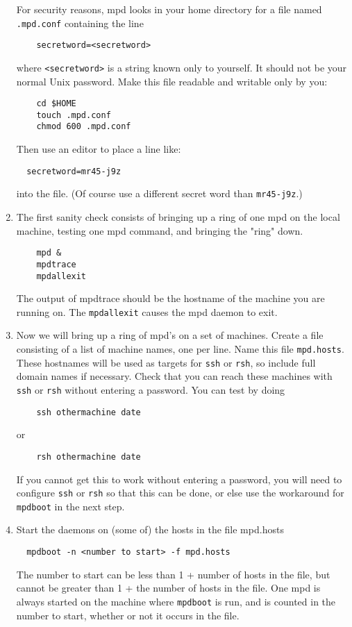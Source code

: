 \documentclass[dvipdfm,11pt]{article}
\begin{document}
\begin{enumerate}
For security reasons, mpd looks in your home directory for a file named
\texttt{.mpd.conf} containing the line
\begin{verbatim}
    secretword=<secretword>
\end{verbatim}
where \verb+<secretword>+ is a string known only to yourself.  It should
not be your normal Unix password.  Make this file readable and writable
only by you:
\begin{verbatim}
    cd $HOME
    touch .mpd.conf
    chmod 600 .mpd.conf
\end{verbatim}
Then use an editor to place a line like:
\begin{verbatim}
  secretword=mr45-j9z
\end{verbatim}
into the file.
(Of course use a different secret word than \verb+mr45-j9z+.)

\item
The first sanity check consists of bringing up a ring of one mpd on
the local machine, testing one mpd command, and bringing the "ring"
down. 
\begin{verbatim}
    mpd & 
    mpdtrace
    mpdallexit
\end{verbatim}
The output of mpdtrace should be the hostname of the machine you are
running on.  The \texttt{mpdallexit} causes the mpd daemon to exit.

\item
Now we will bring up a ring of mpd's on a set of machines.  Create
a file consisting of a list of machine names, one per line.  Name this
file \texttt{mpd.hosts}.  These hostnames will be used as targets for
\texttt{ssh} or \texttt{rsh}, so include full domain names if necessary.  Check that you
can reach these machines with \texttt{ssh} or \texttt{rsh} without
entering a password.  You can test by doing
\begin{verbatim}
    ssh othermachine date
\end{verbatim}
or
\begin{verbatim}
    rsh othermachine date
\end{verbatim}
If you cannot get this to work without entering a password, you will
need to configure \texttt{ssh} or \texttt{rsh} so that this can be done,
or else use the workaround for \texttt{mpdboot} in the next step.

\item
Start the daemons on (some of) the hosts in the file mpd.hosts
\begin{verbatim}
  mpdboot -n <number to start> -f mpd.hosts
\end{verbatim}
The number to start can be less than 1 + number of hosts in the
file, but cannot be greater than 1 + the number of hosts in the
file.  One mpd is always started on the machine where \texttt{mpdboot} is
run, and is counted in the number to start, whether or not it occurs
in the file.


\end{enumerate}
\end{document}
